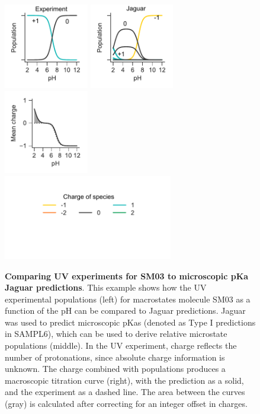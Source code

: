 \documentclass[9pt,lineno,final]{elife}
\begin{document}
\begin{figure}[H]
	\centering
	\includegraphics[width=0.33\textwidth]{Reports/Experiment-populations-SM03-titled.pdf}
	\includegraphics[width=0.33\textwidth]{Reports/Jaguar-TypeI-populations-SM03-titled.pdf}
	\includegraphics[width=0.33\textwidth]{Reports/Jaguar-TypeI-virtual-titration-SM03.pdf}\\
	\includegraphics[width=0.66\textwidth, trim={0 2cm 0 1cm},clip]{Reports/overview-charge-legend-2.pdf}
		\caption{{\bf Comparing UV experiments for SM03 to microscopic pKa Jaguar predictions}. This example shows how the UV experimental populations (left) for macrostates molecule SM03 as a function of the pH can be compared to Jaguar predictions. Jaguar was used to predict microscopic pKas (denoted as Type I predictions in SAMPL6), which can be used to derive relative microstate populations (middle). In the UV experiment, charge reflects the number of protonations, since absolute charge information is unknown. The charge combined with populations produces a macroscopic titration curve (right), with the prediction as a solid, and the experiment as a dashed line. The area between the curves (gray) is calculated after correcting for an integer offset in charges.
	\label{fig:jaguar-prediction}}
\end{figure}
\end{document}
